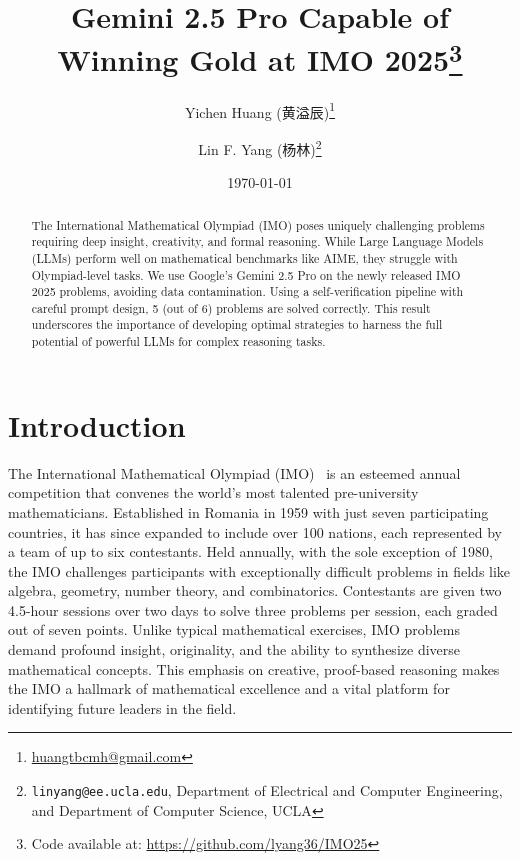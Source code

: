 \title{Gemini 2.5 Pro Capable of Winning Gold at IMO 2025\footnote{Code available at: \url{https://github.com/lyang36/IMO25}}}
\author{Yichen Huang (黄溢辰)\thanks{\href{mailto:huangtbcmh@gmail.com}{huangtbcmh@gmail.com}} \and Lin F. Yang (杨林)\thanks{\texttt{linyang@ee.ucla.edu}, Department of Electrical and Computer Engineering, and Department of Computer Science, UCLA}}
\date{\today}


\begin{CJK}{UTF8}{gbsn}
\maketitle
\end{CJK}
\begin{abstract}
The International Mathematical Olympiad (IMO) poses uniquely challenging problems requiring deep insight, creativity, and formal reasoning. While Large Language Models (LLMs) perform well on mathematical benchmarks like AIME, they struggle with Olympiad-level tasks. We use Google’s Gemini 2.5 Pro on the newly released IMO 2025 problems, avoiding data contamination. Using a self-verification pipeline with careful prompt design, 5 (out of 6) problems are solved correctly. This result underscores the importance of developing optimal strategies to harness the full potential of powerful LLMs for complex reasoning tasks.
\end{abstract}

\section{Introduction}
The International Mathematical Olympiad (IMO)~\cite{imo_official} is an esteemed annual competition that convenes the world's most talented pre-university mathematicians. Established in Romania in 1959 with just seven participating countries, it has since expanded to include over 100 nations, each represented by a team of up to six contestants. Held annually, with the sole exception of 1980, the IMO challenges participants with exceptionally difficult problems in fields like algebra, geometry, number theory, and combinatorics. Contestants are given two 4.5-hour sessions over two days to solve three problems per session, each graded out of seven points.
Unlike typical mathematical exercises, IMO problems demand profound insight, originality, and the ability to synthesize diverse mathematical concepts. This emphasis on creative, proof-based reasoning makes the IMO a hallmark of mathematical excellence and a vital platform for identifying future leaders in the field. 

